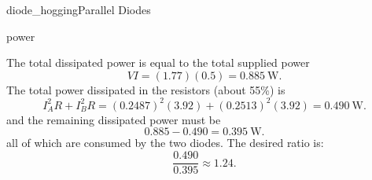 \begin{mainquestion}{diode_hogging}{Parallel Diodes}
\begin{partquestion}{power}
\begin{answer}
The total dissipated power is equal to the total supplied power
\[
VI = (1.77)(0.5) = \qty{0.885}{\watt}.
\]
The total power dissipated in the resistors (about 55\%) is
\[
I_A^2 R + I_B^2 R
=
(0.2487)^2(3.92) + (0.2513)^2(3.92)
=
\qty{0.490}{\watt}.
\]
and the remaining dissipated power must be 
\[
0.885 - 0.490 = \qty{0.395}{\watt}.
\]
all of which are consumed by the two diodes. The desired ratio is:
\[
\frac{0.490}{0.395} \approx 1.24.
\]
\end{answer}
\end{partquestion}

\end{mainquestion}